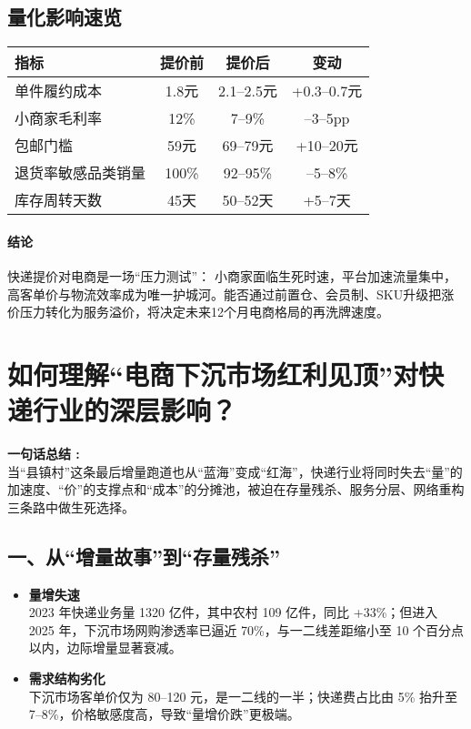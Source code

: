 \subsection{量化影响速览}
\begin{table}[H]
\centering
\begin{tabular}{lccc}
\toprule
指标 & 提价前 & 提价后 & 变动 \\
\midrule
单件履约成本 & 1.8元 & 2.1–2.5元 & +0.3–0.7元 \\
小商家毛利率 & 12\% & 7–9\% & –3–5pp \\
包邮门槛 & 59元 & 69–79元 & +10–20元 \\
退货率敏感品类销量 & 100\% & 92–95\% & –5–8\% \\
库存周转天数 & 45天 & 50–52天 & +5–7天 \\
\bottomrule
\end{tabular}
\end{table}

\paragraph{结论}
快递提价对电商是一场“压力测试”：  
小商家面临生死时速，平台加速流量集中，高客单价与物流效率成为唯一护城河。能否通过前置仓、会员制、SKU升级把涨价压力转化为服务溢价，将决定未来12个月电商格局的再洗牌速度。


\section{如何理解“电商下沉市场红利见顶”对快递行业的深层影响？}

\textbf{一句话总结 :} \\
当“县镇村”这条最后增量跑道也从“蓝海”变成“红海”，快递行业将同时失去“量”的加速度、“价”的支撑点和“成本”的分摊池，被迫在存量残杀、服务分层、网络重构三条路中做生死选择。

\subsection{一、从“增量故事”到“存量残杀”}
\begin{itemize}
  \item \textbf{量增失速}  \\
  2023 年快递业务量 1320 亿件，其中农村 109 亿件，同比 +33\%；但进入 2025 年，下沉市场网购渗透率已逼近 70\%，与一二线差距缩小至 10 个百分点以内，边际增量显著衰减。  
  \item \textbf{需求结构劣化}  \\
  下沉市场客单价仅为 80–120 元，是一二线的一半；快递费占比由 5\% 抬升至 7–8\%，价格敏感度高，导致“量增价跌”更极端。
\end{itemize}

